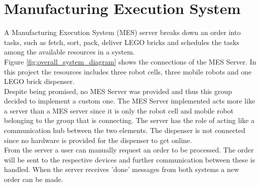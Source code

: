 \chapter{Manufacturing Execution System}\label{chap:mes_server_chapter}

A Manufacturing Execution System (MES) server breaks down an order into tasks, such as fetch, sort, pack, deliver LEGO bricks and schedules the tasks among the available resources in a system. \\

Figure \ref{fig:overall_system_diagram} shows the connections of the MES Server. In this project the resources includes three robot cells, three mobile robots and one LEGO brick dispenser. \\

Despite being promised, no MES Server was provided and thus this group decided to implement a custom one. The MES Server implemented acts more like a server than a MES server since it is only the robot cell and mobile robot belonging to the group that is connecting. The server has the role of acting like a communication hub between the two elements. The dispenser is not connected since no hardware is provided for the dispenser to get online. \\

From the server a user can manually request an order to be processed. The order will be sent to the respective devices and further communication between these is handled. When the server receives 'done' messages from both systems a new order can be made.



%



